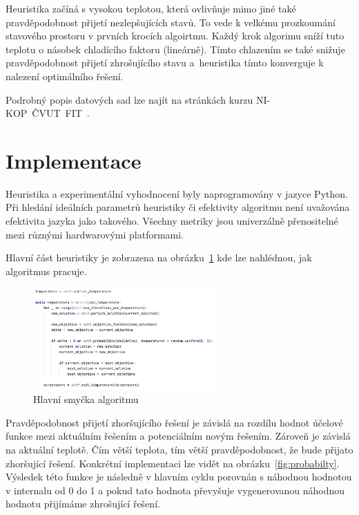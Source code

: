 \documentclass[twoside,twocolumn]{article}
\begin{document}
    Heuristika začíná s vysokou teplotou, která ovlivňuje mimo jiné také pravděpodobnost přijetí nezlepšujících stavů.
    To vede k velkému prozkoumání stavového prostoru v prvních krocích algoirtmu.
    Každý krok algorimu sníží tuto teplotu o násobek chladícího faktoru (lineárně).
    Tímto chlazením se také snižuje pravděpodobnost přijetí zhrošujícího stavu a~heuristika tímto konverguje k nalezení
    optimálního řešení.

    Podrobný popis datových sad lze najít na stránkách kurzu NI-KOP~ČVUT~FIT~\cite{coursesData}.



    \section{Implementace}

    Heuristika a experimentální vyhodnocení byly naprogramovány v jazyce Python.
    Při hledání ideálních parametrů heuristiky či efektivity algoritmu není uvažována efektivita jazyka jako takového.
    Všechny metriky jsou univerzálně přenositelné mezi různými hardwarovými platformami.

    Hlavní část heuristiky je zobrazena na obrázku~\ref{fig:main-loop} kde lze nahlédnou, jak algoritmus pracuje.

    \begin{figure}
        \centering
        \includegraphics[width=7cm]{images/main-loop}
        \caption{Hlavní smyčka algoritmu}
        \label{fig:main-loop}
    \end{figure}

    Pravděpodobnost přijetí zhoršujícího řešení je závislá na rozdílu hodnot účelové funkce mezi aktuálním řešením a potenciálním novým řešením.
    Zároveň je závislá na aktuální teplotě. Čím větší teplota, tím větší pravděpodobnost, že bude přijato zhoršující řešení.
    Konkrétní implementaci lze vidět na obrázku~\ref{fig:probabilty}.
    Výsledek této funkce je následně v hlavním cyklu porovnán s náhodnou hodnotou v internalu od 0 do 1 a pokud tato hodnota
    převyšuje vygenerovanou náhodnou hodnotu přijímáme zhrošující řešení.
\end{document}
